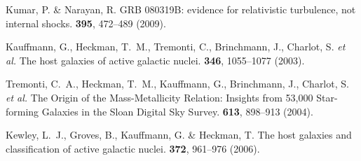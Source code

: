 \begin{thebibliography}{10}
 {Kumar}, P. \& {Narayan},
R. {GRB 080319B: evidence for relativistic turbulence, not internal
shocks}.   {\bf 395}, 472--489
(2009).

 {Kauffmann}, G.,
{Heckman}, T.~M., {Tremonti}, C., {Brinchmann}, J., {Charlot}, S. {\it
et al.} {The host galaxies of active galactic nuclei}.   {\bf 346}, 1055--1077 (2003).

 {Tremonti}, C.~A.,
{Heckman}, T.~M., {Kauffmann}, G., {Brinchmann}, J., {Charlot},
S. {\it et al.} {The Origin of the Mass-Metallicity Relation: Insights
from 53,000 Star-forming Galaxies in the Sloan Digital Sky Survey}.
 {\bf 613}, 898--913 (2004).

 {Kewley}, L.~J., {Groves},
B., {Kauffmann}, G.  \& {Heckman}, T. {The host galaxies and
classification of active galactic nuclei}.   {\bf 372}, 961--976 (2006).

\end{thebibliography}





